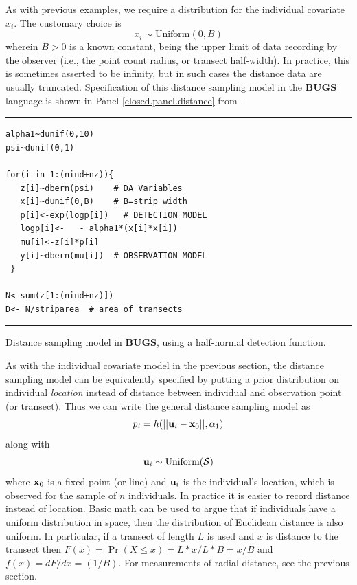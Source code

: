 As with previous examples, we require a distribution for the
individual covariate $x_{i}$. The customary choice is
\[
x_{i} \sim \mbox{Uniform}(0,B)
\]
wherein $B>0$ is a known constant, being the upper limit of data
recording by the observer (i.e., the point count radius, or transect
half-width). In practice, this is sometimes asserted to be infinity,
but in such cases the distance data are usually truncated.
Specification of this distance sampling model in the {\bf BUGS} language is
shown in Panel \ref{closed.panel.distance} from \citet{royle_dorazio:2008}.


\begin{panel}
\centering
\rule[0.15in]{\textwidth}{.03in}
\begin{minipage}{5in}
\begin{verbatim}
alpha1~dunif(0,10)
psi~dunif(0,1)

for(i in 1:(nind+nz)){
   z[i]~dbern(psi)    # DA Variables
   x[i]~dunif(0,B)    # B=strip width
   p[i]<-exp(logp[i])   # DETECTION MODEL
   logp[i]<-   - alpha1*(x[i]*x[i])
   mu[i]<-z[i]*p[i]
   y[i]~dbern(mu[i])  # OBSERVATION MODEL
 }

N<-sum(z[1:(nind+nz)])
D<- N/striparea  # area of transects
\end{verbatim}
\end{minipage}
\rule[-0.15in]{\textwidth}{.03in}
\caption{Distance sampling model in {\bf BUGS}, using a half-normal
detection function.}
\label{closed.panel.distance}
\end{panel}

As with the individual covariate model in the previous section, the
distance sampling model can be equivalently specified by putting a
prior distribution on individual {\it location} instead of distance
between individual and observation point (or transect).  Thus we can
write the general distance sampling model as
\[
p_{i} = h(||{\bf u}_{i} - {\bf x}_0||,\alpha_{1})
\]
along with
\[
 {\bf u}_{i} \sim \mbox{Uniform}({\cal S})
\]
where ${\bf x}_{0}$ is a fixed point (or line) and ${\bf u}_{i}$ is
the individual's location,  which is observed for the sample of $n$ individuals. In
practice it is easier to record distance instead of location.  Basic
math can be used to argue that if individuals have a uniform
distribution in space, then the distribution of Euclidean distance is
also uniform. In particular, if a transect of length $L$ is used and $x$
is distance to the transect then $F(x) = \Pr(X\le x) = L*x/L*B = x/B$ and
$f(x) = dF/dx = (1/B)$. For measurements of radial distance, see the
previous section.

